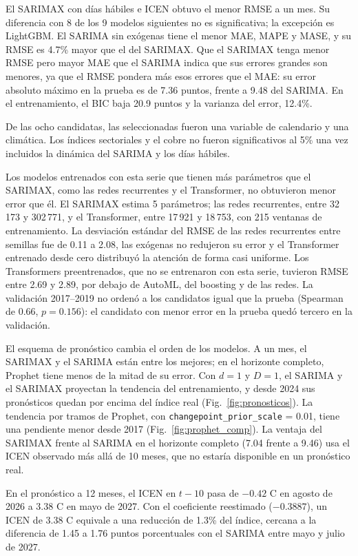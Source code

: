 \documentclass[conference]{IEEEtran}
\newcommand{\code}[1]{\texttt{#1}}
\begin{document}
El SARIMAX con días hábiles e ICEN obtuvo el menor RMSE a un mes. Su diferencia con 8 de los 9 modelos siguientes no es significativa; la excepción es LightGBM. El SARIMA sin exógenas tiene el menor MAE, MAPE y MASE, y su RMSE es 4.7\% mayor que el del SARIMAX. Que el SARIMAX tenga menor RMSE pero mayor MAE que el SARIMA indica que sus errores grandes son menores, ya que el RMSE pondera más esos errores que el MAE: su error absoluto máximo en la prueba es de 7.36 puntos, frente a 9.48 del SARIMA. En el entrenamiento, el BIC baja 20.9 puntos y la varianza del error, 12.4\%.

De las ocho candidatas, las seleccionadas fueron una variable de calendario y una climática. Los índices sectoriales y el cobre no fueron significativos al 5\% una vez incluidos la dinámica del SARIMA y los días hábiles.

Los modelos entrenados con esta serie que tienen más parámetros que el SARIMAX, como las redes recurrentes y el Transformer, no obtuvieron menor error que él. El SARIMAX estima 5 parámetros; las redes recurrentes, entre 32\,173 y 302\,771, y el Transformer, entre 17\,921 y 18\,753, con 215 ventanas de entrenamiento. La desviación estándar del RMSE de las redes recurrentes entre semillas fue de 0.11 a 2.08, las exógenas no redujeron su error y el Transformer entrenado desde cero distribuyó la atención de forma casi uniforme. Los Transformers preentrenados, que no se entrenaron con esta serie, tuvieron RMSE entre 2.69 y 2.89, por debajo de AutoML, del boosting y de las redes. La validación 2017--2019 no ordenó a los candidatos igual que la prueba (Spearman de 0.66, $p=0.156$): el candidato con menor error en la prueba quedó tercero en la validación.

El esquema de pronóstico cambia el orden de los modelos. A un mes, el SARIMAX y el SARIMA están entre los mejores; en el horizonte completo, Prophet tiene menos de la mitad de su error. Con $d=1$ y $D=1$, el SARIMA y el SARIMAX proyectan la tendencia del entrenamiento, y desde 2024 sus pronósticos quedan por encima del índice real (Fig.~\ref{fig:pronosticos}). La tendencia por tramos de Prophet, con \code{changepoint\_prior\_scale} = 0.01, tiene una pendiente menor desde 2017 (Fig.~\ref{fig:prophet_comp}). La ventaja del SARIMAX frente al SARIMA en el horizonte completo (7.04 frente a 9.46) usa el ICEN observado más allá de 10 meses, que no estaría disponible en un pronóstico real.

En el pronóstico a 12 meses, el ICEN en $t-10$ pasa de $-0.42$ \textdegree C en agosto de 2026 a 3.38 \textdegree C en mayo de 2027. Con el coeficiente reestimado ($-0.3887$), un ICEN de 3.38 \textdegree C equivale a una reducción de 1.3\% del índice, cercana a la diferencia de 1.45 a 1.76 puntos porcentuales con el SARIMA entre mayo y julio de 2027.
\end{document}
